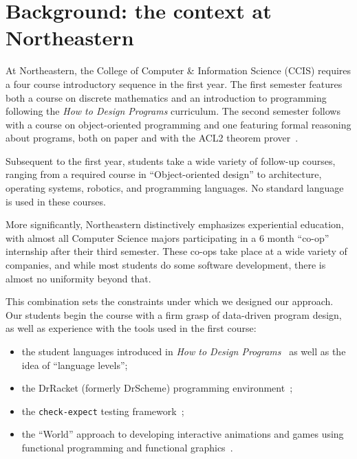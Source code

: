 \documentclass[submission,copyright]{eptcs}
\begin{document}
\section{Background: the context at Northeastern}
\label{sec:background}

At Northeastern, the College of Computer \& Information Science (CCIS)
requires a four course introductory sequence in the first year.  The
first semester features both a course on discrete mathematics and
 an introduction to programming following the \emph{How to Design
  Programs} curriculum.  The second semester follows with a course on
object-oriented programming and one featuring formal reasoning about
programs, both on paper and with the ACL2 theorem
prover~\cite{dvanhorn:Kaufmann2000ComputerAided}.

Subsequent to the first year, students take a wide variety of
follow-up courses, ranging from a required course in ``Object-oriented
design'' to architecture, operating systems, robotics, and programming
languages.  No standard language is used in these courses.  

More significantly, Northeastern distinctively emphasizes experiential
education, with almost all Computer Science majors participating in a
6 month ``co-op'' internship after their third semester.  These co-ops
take place at a wide variety of companies, and while most students do
some software development, there is almost no uniformity beyond that. 

This combination sets the constraints under which we designed our
approach.  Our students begin the course with a firm grasp of
data-driven program design, as well as experience with the tools used
in the first course:

\begin{itemize}
  \item the student languages introduced in \emph{How to Design
    Programs}~\cite{dvanhorn:Felleisen2004Structure,
    dvanhorn:Felleisen2001How} as well as the idea of ``language levels'';

  \item the DrRacket (formerly DrScheme) 
    programming environment~\cite{dvanhorn:Findler2002DrScheme};

  \item the \texttt{check-expect} testing framework~\cite{local:check-expect};

  \item the ``World'' approach to developing interactive animations
    and games using functional programming and functional
    graphics~\cite{dvanhorn:Felleisen2009Functional,
      local:barland-sfp10}.
\end{itemize}
\end{document}
